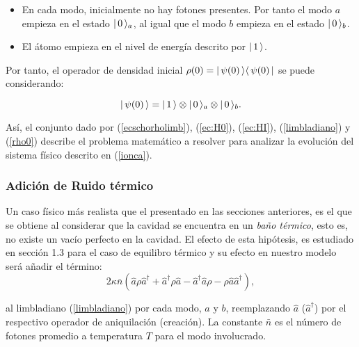 \begin{itemize}
 \item En cada modo, inicialmente no hay fotones presentes. Por tanto el modo $a$ empieza en el estado $\vert\, 0 \,\rangle_a$, al igual que el modo $b$ empieza en el estado $\vert\, 0 \,\rangle_b$.
\item El \'atomo empieza en el nivel de energ\'ia descrito por $\vert\, 1 \,\rangle$.
\end{itemize}

Por tanto, el operador de densidad inicial $\rho(0)=\vert\, \psi(0) \,\rangle\langle\, \psi(0) \,\vert$ se puede considerando:

\begin{equation}
 \vert\, \psi(0) \,\rangle=\vert\, 1 \,\rangle\otimes \vert\, 0 \,\rangle_a \otimes \vert\, 0 \,\rangle_b.\label{rho0}
\end{equation}

\quad As\'i, el conjunto dado por (\ref{ecschorholimb}), (\ref{ec:H0}), (\ref{ec:HI}), (\ref{limbladiano}) y (\ref{rho0}) describe el problema matem\'atico a resolver para analizar la evoluci\'on del sistema f\'isico descrito en (\ref{ionca}).

\subsubsection{Adici\'on de Ruido t\'ermico}\label{ruidotermico}
\quad Un caso f\'isico m\'as realista que el presentado en las secciones anteriores, es el que se obtiene al considerar que la cavidad se encuentra en un \emph{ba\~no t\'ermico}, esto es, no existe un vac\'io perfecto en la cavidad. El efecto de esta hip\'otesis, es estudiado en \cite{carmichael} secci\'on 1.3 para el caso de equilibro t\'ermico y su efecto en nuestro modelo ser\'a a\~nadir el t\'ermino:
\begin{equation}
 2\kappa\bar{n}(\hat{a}\rho\hat{a}^\dag+\hat{a}^\dag\rho \hat{a}-\hat{a}^\dag \hat{a}\rho-\rho \hat{a} \hat{a}^\dag),\label{ruido}
\end{equation}

al limbladiano (\ref{limbladiano}) por cada modo, $a$ y $b$, reemplazando $\hat{a}$ ($\hat{a}^\dag$) por el respectivo operador de aniquilaci\'on (creaci\'on). La constante $\bar{n}$ es el n\'umero de fotones promedio a temperatura $T$ para el modo involucrado.

